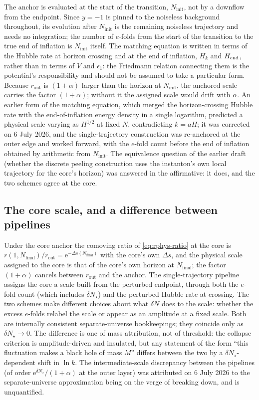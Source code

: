 \documentclass[a4paper,11pt]{article}
\newcommand{\e}[1]{\mathrm{e}^{{#1}}}
\newcommand{\Ny}{N}                          %
\newcommand{\Ninit}{N_{\mathrm{init}}}       %
\newcommand{\Nfinal}{N_{\mathrm{final}}}     %
\newcommand{\dNstar}{\delta N_\star}         %
\newcommand{\epsSR}{\epsilon_1}              %
\newcommand{\Hub}{H}                         %
\newcommand{\Vpot}{V}                        %
\newcommand{\rad}{r}                         %
\newcommand{\yco}{y}                         %
\newcommand{\rout}{\rad_{\mathrm{out}}}      %
\newcommand{\Deltas}{\Delta s}                %
\begin{document}
The anchor is evaluated at the start of the transition, $\Ninit$, not by a
downflow from the endpoint. Since $\yco=-1$ is pinned to the noiseless
background throughout, its evolution after $\Ninit$ is the remaining
noiseless trajectory and needs no integration; the number of $e$-folds
from the start of the transition to the true end of inflation is $\Ninit$
itself. The matching equation is written in terms of the Hubble rate at
horizon crossing and at the end of inflation, $\Hub_k$ and $\Hub_{\rm end}$,
rather than in terms of $\Vpot$ and $\epsSR$: the Friedmann relation
connecting them is the potential's responsibility and should not be
assumed to take a particular form. Because $\rout$ is $(1+\alpha)$ larger
than the horizon at $\Ninit$, the anchored scale carries the factor
$(1+\alpha)$; without it the assigned scale would drift with $\alpha$.
An earlier form of the matching equation, which merged the
horizon-crossing Hubble rate with the end-of-inflation energy density in a
single logarithm, predicted a physical scale varying as $\Hub^{1/2}$ at
fixed $\Ny$, contradicting $k=a\Hub$; it was corrected on 6 July 2026,
and the single-trajectory construction was re-anchored at the outer edge
and worked forward, with the $e$-fold count before the end of inflation
obtained by arithmetic from $\Ninit$. The equivalence question of the
earlier draft (whether the discrete peeling construction uses the
instanton's own local trajectory for the core's horizon) was answered in
the affirmative: it does, and the two schemes agree at the core.

\subsection{The core scale, and a difference between pipelines}
\label{sec:core-scale}

Under the core anchor the comoving ratio of \eqref{eq:rphys-ratio} at the
core is $\rad(1,\Nfinal)/\rout=\e{-\Deltas(\Nfinal)}$ with the core's own
$\Deltas$, and the physical scale assigned to the core is that of the
core's own horizon at $\Nfinal$; the factor $(1+\alpha)$ cancels between
$\rout$ and the anchor. The single-trajectory pipeline assigns the core a
scale built from the perturbed endpoint, through both the $e$-fold count
(which includes $\dNstar$) and the perturbed Hubble rate at crossing. The
two schemes make different choices about what $\delta N$ does to the
scale: whether the excess $e$-folds relabel the scale or appear as an
amplitude at a fixed scale. Both are internally consistent
separate-universe bookkeepings; they coincide only as $\dNstar\to0$. The
difference is one of mass attribution, not of threshold: the collapse
criterion is amplitude-driven and insulated, but any statement of the form
``this fluctuation makes a black hole of mass $M$'' differs between the
two by a $\dNstar$-dependent shift in $\ln k$. The intermediate-scale
discrepancy between the pipelines (of order $\e{\dNstar}/(1+\alpha)$ at
the outer layer) was attributed on 6 July 2026 to the separate-universe
approximation being on the verge of breaking down, and is unquantified.
\end{document}
